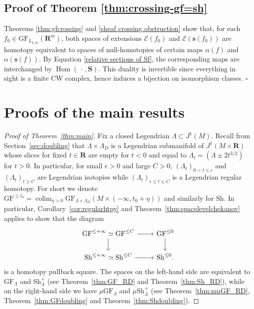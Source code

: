 \documentclass[12pt,a4paper]{article}
\numberwithin{equation}{section}
\theoremstyle{definition}
\theoremstyle{remark}
\newcommand{\E}{\mathcal{E}}
\newcommand{\R}{\mathbf{R}}
\newcommand{\s}{\mathbf{s}}
\newcommand{\Sh}{\mathrm{Sh}}
\renewcommand{\S}{\mathbf{S}}
\DeclareMathOperator{\Hom}{Hom}
\DeclareMathOperator{\colim}{colim}
\newcommand{\GF}{\mathrm{GF}}
\begin{document}
\subsection{Proof of Theorem \ref{thm:crossing-gf=sh}}

Theorems \ref{thm:gfcrossing} and \ref{sheaf crossing obstruction} show that, for each $f_0\in \GF_{L_{k,m}}(\R^m)$, both spaces of extensions $\E(f_0)$ and $\E(\s(f_0))$ are homotopy equivalent to spaces of null-homotopies of certain maps $\alpha(f)$ and $\alpha(\s(f))$. By Equation \eqref{relative sections of Sf}, the corresponding maps are interchanged by $\Hom(\,\cdot\,, \S)$. This duality is invertible since everything in sight is a finite CW complex, hence induces a bijection on isomorphism classes. $\square$


\section{Proofs of the main results}\label{sec:mainproofs}
\begin{proof}[Proof of Theorem~\ref{thm:main}]
Fix a closed Legendrian $\Lambda\subset J^1(M)$. Recall from Section~\ref{sec:doubling} that $\Lambda\times \Lambda_D$ is a Legendrian submanifold of $J^1(M\times \R)$
whose slices for fixed $t\in \R$ are empty for $t<0$ and equal to $\Lambda_t=(\Lambda\pm 2t^{3/2})$ for $t>0$. In particular, for small $\epsilon >0$ and large $C>0$,
$(\Lambda_t)_{0<t\leq \epsilon}$ and $(\Lambda_t)_{t\geq C}$ are Legendrian isotopies while $(\Lambda_t)_{\epsilon\leq t\leq C}$ is a Legendrian regular homotopy.
For short we denote $\GF^{\leq t_0}=\colim_{\eta >0} \GF_{\Lambda\times \Lambda_D}(M\times (-\infty,t_0+\eta))$ and similarly for $\Sh$.
In particular, Corollary~\ref{cor:regularhtpy} and Theorem~\ref{thm:spacelevelchekanov} applies to show that the diagram
\[\begin{tikzcd}
 \GF^{\leq +\infty}\simeq \GF^{\leq C}\arrow[r]\arrow[d] & \GF^{\leq 0}  \arrow[d]\\
\Sh^{\leq +\infty}\simeq \Sh^{\leq C} \arrow[r] & \Sh^{\leq 0}.
\end{tikzcd}\]
is a homotopy pullback square.
The spaces on the left-hand side are equivalent to $\GF_\Lambda$ and $\Sh^+_\Lambda$ (see Theorem~\ref{thm:GF_RD} and Theorem~\ref{thm:Sh_RD}), while on the right-hand side
we have $\mu\GF_\Lambda$ and $\mu\Sh^+_\Lambda$ (see Theorem~\ref{thm:muGF_RD}, Theorem~\ref{thm:GFdoubling} and Theorem~\ref{thm:Shdoubling}).
\end{proof}
\end{document}
